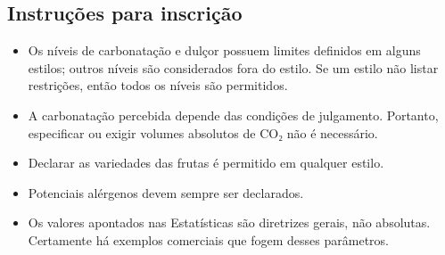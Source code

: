 \subsection*{Instruções para inscrição}

\begin{itemize}
\item Os níveis de carbonatação e dulçor possuem limites definidos em alguns estilos; outros níveis são considerados fora do estilo. Se um estilo não listar restrições, então todos os níveis são permitidos.
\item A carbonatação percebida depende das condições de julgamento. Portanto, especificar ou exigir volumes absolutos de CO₂ não é necessário.
\item Declarar as variedades das frutas é permitido em qualquer estilo.
\item Potenciais alérgenos devem sempre ser declarados.
\item Os valores apontados nas Estatísticas são diretrizes gerais, não absolutas. Certamente há exemplos comerciais que fogem desses parâmetros.
\end{itemize}
